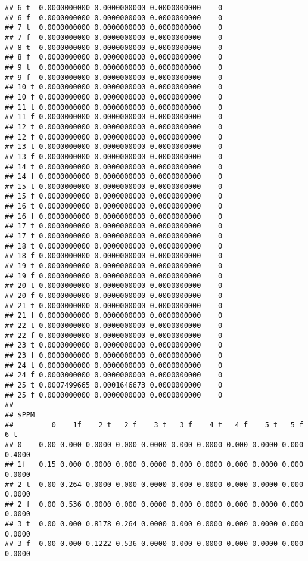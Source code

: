 \documentclass[]{article}
\begin{document}
\begin{verbatim}
## 6 t  0.0000000000 0.0000000000 0.0000000000    0
## 6 f  0.0000000000 0.0000000000 0.0000000000    0
## 7 t  0.0000000000 0.0000000000 0.0000000000    0
## 7 f  0.0000000000 0.0000000000 0.0000000000    0
## 8 t  0.0000000000 0.0000000000 0.0000000000    0
## 8 f  0.0000000000 0.0000000000 0.0000000000    0
## 9 t  0.0000000000 0.0000000000 0.0000000000    0
## 9 f  0.0000000000 0.0000000000 0.0000000000    0
## 10 t 0.0000000000 0.0000000000 0.0000000000    0
## 10 f 0.0000000000 0.0000000000 0.0000000000    0
## 11 t 0.0000000000 0.0000000000 0.0000000000    0
## 11 f 0.0000000000 0.0000000000 0.0000000000    0
## 12 t 0.0000000000 0.0000000000 0.0000000000    0
## 12 f 0.0000000000 0.0000000000 0.0000000000    0
## 13 t 0.0000000000 0.0000000000 0.0000000000    0
## 13 f 0.0000000000 0.0000000000 0.0000000000    0
## 14 t 0.0000000000 0.0000000000 0.0000000000    0
## 14 f 0.0000000000 0.0000000000 0.0000000000    0
## 15 t 0.0000000000 0.0000000000 0.0000000000    0
## 15 f 0.0000000000 0.0000000000 0.0000000000    0
## 16 t 0.0000000000 0.0000000000 0.0000000000    0
## 16 f 0.0000000000 0.0000000000 0.0000000000    0
## 17 t 0.0000000000 0.0000000000 0.0000000000    0
## 17 f 0.0000000000 0.0000000000 0.0000000000    0
## 18 t 0.0000000000 0.0000000000 0.0000000000    0
## 18 f 0.0000000000 0.0000000000 0.0000000000    0
## 19 t 0.0000000000 0.0000000000 0.0000000000    0
## 19 f 0.0000000000 0.0000000000 0.0000000000    0
## 20 t 0.0000000000 0.0000000000 0.0000000000    0
## 20 f 0.0000000000 0.0000000000 0.0000000000    0
## 21 t 0.0000000000 0.0000000000 0.0000000000    0
## 21 f 0.0000000000 0.0000000000 0.0000000000    0
## 22 t 0.0000000000 0.0000000000 0.0000000000    0
## 22 f 0.0000000000 0.0000000000 0.0000000000    0
## 23 t 0.0000000000 0.0000000000 0.0000000000    0
## 23 f 0.0000000000 0.0000000000 0.0000000000    0
## 24 t 0.0000000000 0.0000000000 0.0000000000    0
## 24 f 0.0000000000 0.0000000000 0.0000000000    0
## 25 t 0.0007499665 0.0001646673 0.0000000000    0
## 25 f 0.0000000000 0.0000000000 0.0000000000    0
## 
## $PPM
##         0    1f    2 t   2 f    3 t   3 f    4 t   4 f    5 t   5 f    6 t
## 0    0.00 0.000 0.0000 0.000 0.0000 0.000 0.0000 0.000 0.0000 0.000 0.4000
## 1f   0.15 0.000 0.0000 0.000 0.0000 0.000 0.0000 0.000 0.0000 0.000 0.0000
## 2 t  0.00 0.264 0.0000 0.000 0.0000 0.000 0.0000 0.000 0.0000 0.000 0.0000
## 2 f  0.00 0.536 0.0000 0.000 0.0000 0.000 0.0000 0.000 0.0000 0.000 0.0000
## 3 t  0.00 0.000 0.8178 0.264 0.0000 0.000 0.0000 0.000 0.0000 0.000 0.0000
## 3 f  0.00 0.000 0.1222 0.536 0.0000 0.000 0.0000 0.000 0.0000 0.000 0.0000

\end{verbatim}
\end{document}
